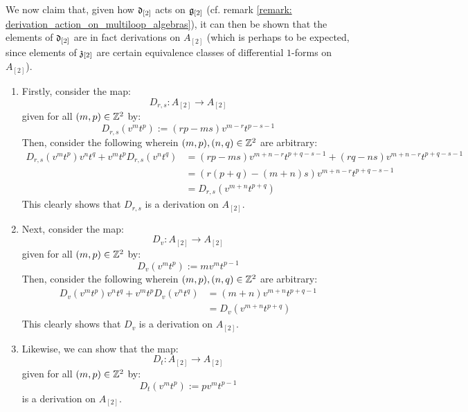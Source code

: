 \begin{remark}
                We now claim that, given how $\mathfrak{d}_{[2]}$ acts on $\mathfrak{g}_{[2]}$ (cf. remark \ref{remark: derivation_action_on_multiloop_algebras}), it can then be shown that the elements of $\mathfrak{d}_{[2]}$ are in fact derivations on $A_{[2]}$ (which is perhaps to be expected, since elements of $\mathfrak{z}_{[2]}$ are certain equivalence classes of differential $1$-forms on $A_{[2]}$).
                \begin{enumerate}
                    \item Firstly, consider the map:
                        $$D_{r, s}: A_{[2]} \to A_{[2]}$$
                    given for all $(m, p) \in \mathbb{Z}^2$ by:
                        $$D_{r, s}(v^m t^p) := ( rp - ms ) v^{m - r} t^{p - s - 1}$$
                    Then, consider the following wherein $(m, p), (n, q) \in \mathbb{Z}^2$ are arbitrary:
                        $$
                            \begin{aligned}
                                D_{r, s}(v^m t^p) v^n t^q + v^m t^p D_{r, s}(v^n t^q) & = ( rp - ms ) v^{m + n - r} t^{p + q - s - 1} + ( rq - ns ) v^{m + n - r} t^{p + q - s - 1}
                                \\
                                & = ( r(p + q) - (m + n)s ) v^{m + n - r} t^{p + q - s - 1}
                                \\
                                & = D_{r, s}( v^{m + n} t^{p + q} )
                            \end{aligned}
                        $$
                    This clearly shows that $D_{r, s}$ is a derivation on $A_{[2]}$.
                    \item Next, consider the map:
                        $$D_v: A_{[2]} \to A_{[2]}$$
                    given for all $(m, p) \in \mathbb{Z}^2$ by:
                        $$D_v(v^m t^p) := m v^m t^{p - 1}$$
                    Then, consider the following wherein $(m, p), (n, q) \in \mathbb{Z}^2$ are arbitrary:
                        $$
                            \begin{aligned}
                                D_v(v^m t^p) v^n t^q + v^m t^p D_v(v^n t^q) & = (m + n) v^{m + n} t^{p + q - 1}
                                \\
                                & = D_v( v^{m + n} t^{p + q} )
                            \end{aligned}
                        $$
                    This clearly shows that $D_v$ is a derivation on $A_{[2]}$.
                    \item Likewise, we can show that the map:
                        $$D_t: A_{[2]} \to A_{[2]}$$
                    given for all $(m, p) \in \mathbb{Z}^2$ by:
                        $$D_t(v^m t^p) := p v^m t^{p - 1}$$
                    is a derivation on $A_{[2]}$.
                \end{enumerate}


\end{remark}
